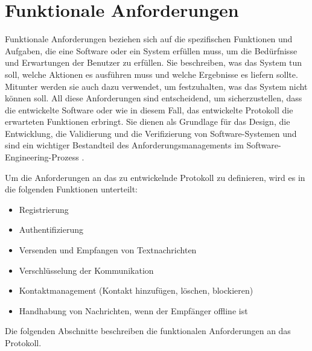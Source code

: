 \section{Funktionale Anforderungen}



Funktionale Anforderungen beziehen sich auf die spezifischen Funktionen und Aufgaben, 
die eine Software oder ein System erfüllen muss, um die Bedürfnisse und Erwartungen der Benutzer zu erfüllen.
Sie beschreiben, was das System tun soll, welche Aktionen es ausführen muss und welche 
Ergebnisse es liefern sollte. Mitunter werden sie auch dazu verwendet, um festzuhalten, was das System
nicht können soll.
All diese Anforderungen sind entscheidend, um sicherzustellen, dass die entwickelte Software 
oder wie in diesem Fall, das entwickelte Protokoll die erwarteten Funktionen erbringt. Sie dienen 
als Grundlage für das Design, die Entwicklung, die Validierung und die Verifizierung von Software-Systemen und 
sind ein wichtiger Bestandteil des Anforderungsmanagements im Software-Engineering-Prozess 
\parencite[S. 124-126]{Sommerville_AnfAnalyse}.

\noindent Um die Anforderungen an das zu entwickelnde Protokoll zu definieren, wird es in die folgenden
Funktionen unterteilt:

\begin{itemize}
    \item Registrierung
    \item Authentifizierung
    \item Versenden und Empfangen von Textnachrichten
    \item Verschlüsselung der Kommunikation
    \item Kontaktmanagement (Kontakt hinzufügen, löschen, blockieren)
    \item Handhabung von Nachrichten, wenn der Empfänger offline ist
\end{itemize}

\noindent Die folgenden Abschnitte beschreiben die funktionalen Anforderungen an das Protokoll.
\\







 

%
%